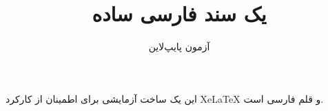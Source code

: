 \documentclass{article}
\title{یک سند فارسی ساده}
\author{آزمون پایپ‌لاین}
\begin{document}
\maketitle
این یک ساخت آزمایشی برای اطمینان از کارکرد XeLaTeX و قلم فارسی است.
\end{document}
